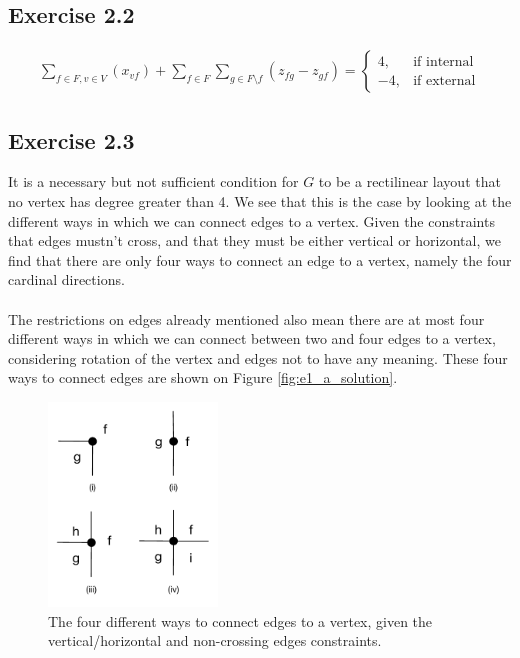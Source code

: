 \documentclass[12pt]{article}
\begin{document}
\subsection*{Exercise 2.2}

  \begin{align*}
      \sum_{f \in F, v \in V}(x_{vf}) + \sum_{f \in F}\sum_{g \in F \setminus f}(z_{fg} - z_{gf}) = \begin{cases}
                                                                                       4, & \text{if internal}\\
                                                                                      -4, & \text{if external}
                                                                                   \end{cases}
  \end{align*}

\subsection*{Exercise 2.3}
It is a necessary but not sufficient condition for $G$ to be a rectilinear layout that no vertex has degree greater than 4. We see that this is the case by looking at the different ways in which we can connect edges to a vertex. Given the constraints that edges mustn't cross, and that they must be either vertical or horizontal, we find that there are only four ways to connect an edge to a vertex, namely the four cardinal directions.\\
\\
The restrictions on edges already mentioned also mean there are at most four different ways in which we can connect between two and four edges to a vertex, considering rotation of the vertex and edges not to have any meaning. These four ways to connect edges are shown on Figure \ref{fig:e1_a_solution}.

\begin{figure}[h]
    \centering
      \includegraphics[width=0.4\textwidth]{figures/e2_3}
    \caption{The four different ways to connect edges to a vertex, given the vertical/horizontal and non-crossing edges constraints.}
    \label{fig:e2_3}
\end{figure}
\end{document}

